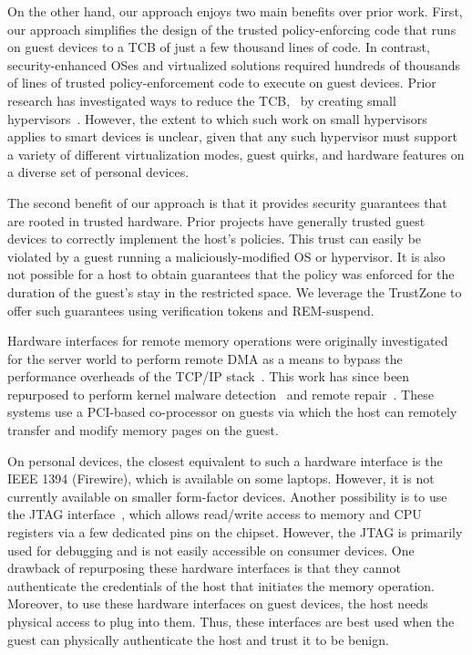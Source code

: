 On the other hand, our approach enjoys two main benefits over prior work.
First, our approach simplifies the design of the trusted policy-enforcing code
that runs on guest devices to a TCB of just a few thousand lines of code. In
contrast, security-enhanced OSes and virtualized solutions required hundreds of
thousands of lines of trusted policy-enforcement code to execute on guest
devices.  Prior research has investigated ways to reduce the TCB, \eg~by
creating small hypervisors~\cite{nova:eurosys09}. However, the extent to which
such work on small hypervisors applies to smart devices is unclear, given that
any such hypervisor must support a variety of different virtualization modes,
guest quirks, and hardware features on a diverse set of personal devices.

The second benefit of our approach is that it provides security guarantees that
are rooted in trusted hardware. Prior projects have generally trusted guest
devices to correctly implement the host's policies. This trust can easily be
violated by a guest running a maliciously-modified OS or hypervisor.  It is
also not possible for a host to obtain guarantees that the policy was enforced
for the duration of the guest's stay in the restricted space. We leverage the
TrustZone to offer such guarantees using verification tokens and REM-suspend.

%
Hardware interfaces for remote memory operations were originally investigated
for the server world to perform remote DMA as a means to bypass the performance
overheads of the TCP/IP stack~\cite{mellanox,infiniband}.  This work has since
been repurposed to perform kernel malware detection~\cite{copilot:sec04} and
remote repair~\cite{backdoor:icac04}. These systems use a PCI-based
co-processor on guests via which the host can remotely transfer and modify
memory pages on the guest.

On personal devices, the closest equivalent to such a hardware interface is the
IEEE 1394 (Firewire), which is available on some laptops. However, it is not
currently available on smaller form-factor devices.  Another possibility is to
use the JTAG interface~\cite{jtag}, which allows read/write access to memory
and CPU registers via a few dedicated pins on the chipset.  However, the JTAG
is primarily used for debugging and is not easily accessible on consumer
devices.  One drawback of repurposing these hardware interfaces is that they
cannot authenticate the credentials of the host that initiates the memory
operation. Moreover, to use these hardware interfaces on guest devices, the
host needs physical access to plug into them.  Thus, these interfaces are best
used when the guest can physically authenticate the host and trust it to be
benign.


